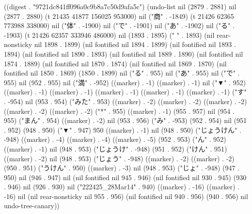 
((digest . "9721dc841ff096a0c9b8a7c50d9afa5c") (undo-list nil (2879 . 2881) nil (2877 . 2880) (t 21435 41877 156025 953000) nil ("商" . -1849) (t 21426 62365 773988 338000) nil ("体" . -1900) nil ("で" . -1901) nil ("あ" . -1902) nil ("る" . -1903) (t 21426 62357 333946 486000) nil (1893 . 1895) (" " . 1893) (nil rear-nonsticky nil 1898 . 1899) (nil fontified nil 1894 . 1899) (nil fontified nil 1893 . 1894) (nil fontified nil 1890 . 1893) (nil fontified nil 1889 . 1890) (nil fontified nil 1874 . 1889) (nil fontified nil 1870 . 1874) (nil fontified nil 1869 . 1870) (nil fontified nil 1850 . 1869) (1850 . 1899) nil ("る" . 955) nil ("あ" . 955) nil ("で" . 955) nil (952 . 955) nil ("満" . -952) ((marker) . -1) ((marker) . -1) nil ("▼" . 952) ((marker) . -1) ((marker) . -1) ((marker) . -1) ((marker) . -1) ((marker) . -1) ("す" . -954) nil (953 . 954) ("みた" . 953) ((marker) . -2) ((marker) . -2) ((marker) . -2) ((marker) . -2) ((marker) . -2) ("*" . 955) ((marker) . -1) (955 . 957) nil (954 . 955) ("まん" . 954) ((marker) . -2) nil (953 . 956) ("み" . -953) (952 . 954) nil (951 . 952) (948 . 950) ("▼" . 947) 950 ((marker) . -1) nil (948 . 950) ("じょうけん" . -948) ((marker) . -4) ((marker) . -4) ((marker) . -5) (952 . 953) ("ん" . 952) ((marker) . -1) nil (948 . 953) ("じょうけ" . -948) (951 . 952) ("けん" . 951) ((marker) . -2) nil (948 . 953) ("じょう" . -948) ((marker) . -2) ((marker) . -2) (950 . 951) ("うけん" . 950) ((marker) . -3) nil (948 . 953) ("じょ" . -948) (947 . 950) nil (946 . 947) nil (nil fontified nil 945 . 946) (nil fontified nil 930 . 945) (930 . 946) nil (926 . 930) nil ("{222425_28Mar14}" . 940) ((marker) . -16) ((marker) . -16) nil (nil rear-nonsticky nil 955 . 956) (nil fontified nil 940 . 956) (940 . 956) nil undo-tree-canary))
